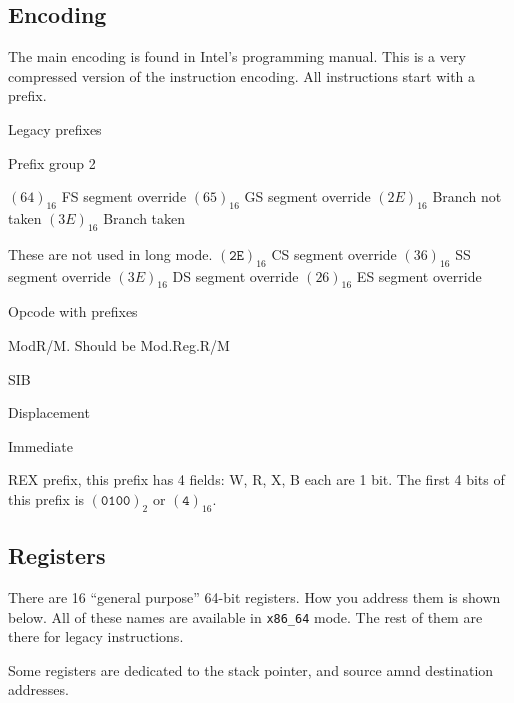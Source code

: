 \subsection{Encoding}

The main encoding is found in Intel's programming manual. This is a very
compressed version of the instruction encoding. All instructions start with a
prefix.

Legacy prefixes

Prefix group 2

$(64)_{16}$ FS segment override
$(65)_{16}$ GS segment override
$(2E)_{16}$ Branch not taken
$(3E)_{16}$ Branch taken

These are not used in long mode.
$(\texttt{2E})_{16}$ CS segment override
$(36)_{16}$ SS segment override
$(3E)_{16}$ DS segment override
$(26)_{16}$ ES segment override

Opcode with prefixes

ModR/M. Should be Mod.Reg.R/M

SIB

Displacement

Immediate

REX prefix, this prefix has 4 fields: W, R, X, B each are 1 bit. The first 4
bits of this prefix is $(\texttt{0100})_2$ or $(\texttt{4})_{16}$.

\subsection{Registers}

There are 16 ``general purpose'' 64-bit registers. How you address them is shown
below. All of these names are available in \texttt{x86\_64} mode. The rest of
them are there for legacy instructions.

Some registers are dedicated to the stack pointer, and source amnd destination
addresses.

% 
% 
% 
% 
% 
% 
% 

